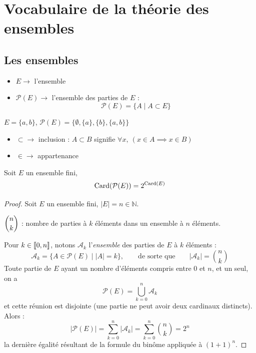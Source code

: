 \chapter{Vocabulaire de la théorie des ensembles}
\label{chap:ensembles}

\section{Les ensembles}

\begin{itemize}
    \item $E \to$ l'ensemble
    \item $\mathcal{P}(E) \to$ l'ensemble des parties de $E$ :
    \[\mathcal{P}(E) = \{A \mid A \subset E\}\]
\end{itemize}

\begin{exemple}
$E = \{a,b\}$, \quad $\mathcal{P}(E) = \{\emptyset, \{a\}, \{b\}, \{a,b\}\}$
\end{exemple}

\begin{itemize}
    \item $\subset \to$ inclusion : $A \subset B$ signifie $\forall x,\ (x \in A \implies x \in B)$
    \item $\in \to$ appartenance
\end{itemize}

\begin{center}
\end{center}

\begin{prop}
\label{prop:card-parties}
Soit $E$ un ensemble fini,
\[\operatorname{Card}(\mathcal{P}(E)) = 2^{\operatorname{Card}(E)}\]
\end{prop}

\begin{proof}
Soit $E$ un ensemble fini, $|E| = n \in \mathbb{N}$.

$\dbinom{n}{k}$ : nombre de parties à $k$ éléments dans un ensemble à $n$ éléments.

Pour $k\in\llbracket 0,n \rrbracket$, notons $\mathcal{A}_k$ l'\emph{ensemble} des parties de $E$ à $k$ éléments :
\[\mathcal{A}_k = \{A \in \mathcal{P}(E) \mid |A| = k\}, \qquad \text{de sorte que} \qquad |\mathcal{A}_k| = \binom{n}{k}\]
Toute partie de $E$ ayant un nombre d'éléments compris entre $0$ et $n$, et un seul, on a
\[\mathcal{P}(E) = \bigcup_{k=0}^{n} \mathcal{A}_k\]
et cette réunion est disjointe (une partie ne peut avoir deux cardinaux distincts). Alors :
\[|\mathcal{P}(E)| = \sum_{k=0}^{n} |\mathcal{A}_k| = \sum_{k=0}^{n} \binom{n}{k} = 2^n\]
la dernière égalité résultant de la formule du binôme appliquée à $(1+1)^n$.
\end{proof}

